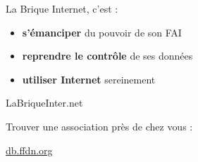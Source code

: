\documentclass[notes=hide]{beamer}
\begin{document}
\begin{frame}[t]{La Brique Internet, c'est :}
\vfill
\begin{itemize}
\item \textbf{s'émanciper} du pouvoir de son FAI \vfill
\item \textbf{reprendre le contrôle} de ses données \vfill
\item \textbf{utiliser Internet} sereinement
\end{itemize}
\vfill
\end{frame}

\begin{frame}[t]{}
\begin{center}
\vfill
\vspace{.5cm}

{\Huge LaBriqueInter.net}
\vspace{1.5cm}

Trouver une association près de chez vous :
\vspace{.5cm}

{\Large \url{db.ffdn.org}}
\vfill
\end{center}
\end{frame}
\end{document}
